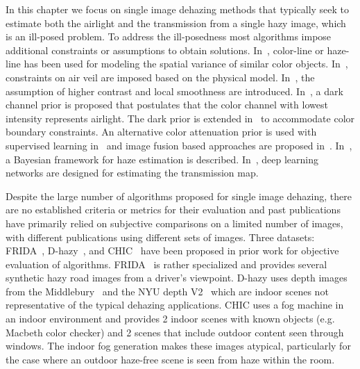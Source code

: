 In this chapter we focus on single image dehazing methods that typically seek to estimate both the airlight and the transmission from a single hazy image, which is an ill-posed problem. To address the ill-posedness most algorithms impose additional constraints or assumptions to obtain solutions. In~\cite{fattal2008single,fattal2014dehazing,berman2016non}, color-line or haze-line has been used for modeling the spatial variance of similar color objects. In~\cite{tarel2009fast}, constraints on air veil are imposed based on the physical model. In~\cite{tan2008visibility}, the assumption of higher contrast and local smoothness are introduced. In~\cite{he2011single}, a dark channel prior is proposed that postulates that the color channel with lowest intensity represents airlight. The dark prior is extended in~\cite{meng2013efficient} to accommodate color boundary constraints. An alternative color attenuation prior is used with supervised learning in~\cite{zhu2015fast} and image fusion based approaches are proposed in~\cite{ancuti2010fast,ancuti2013single}.
In~\cite{nishino2012bayesian}, a Bayesian framework for haze estimation is described. In~\cite{cai2016dehazenet, Ren-ECCV-2016}, deep learning networks are designed for estimating the transmission map.

Despite the large number of algorithms proposed for single image dehazing, there are no established criteria or metrics for their evaluation and past publications have primarily relied on subjective comparisons on a limited number of images, with different publications using different sets of images. Three datasets: FRIDA~\cite{tarel2012vision}, D-hazy~\cite{7532754}, and CHIC~\cite{el2016color} have been proposed in prior work for objective evaluation of algorithms. FRIDA~\cite{tarel2012vision} is rather specialized and provides several synthetic hazy road images from a driver's viewpoint. D-hazy uses depth images from the Middlebury~\cite{scharstein2014high} and the NYU depth V2~\cite{silberman2012indoor} which are indoor scenes not representative of the typical dehazing applications. CHIC uses a fog machine in an indoor environment and provides 2 indoor scenes with known objects (e.g. Macbeth color checker) and 2 scenes that include outdoor content seen through windows. The indoor fog generation makes these images atypical, particularly for the case where an outdoor haze-free scene is seen from haze within the room.

